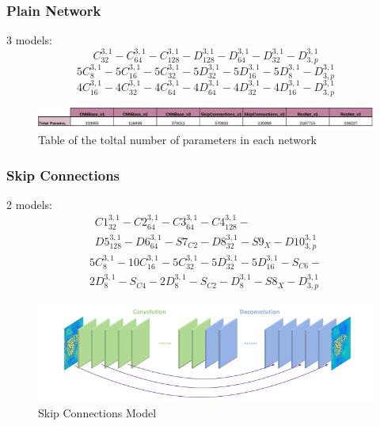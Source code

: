 \documentclass [handout] {beamer}
\begin{document}
\begin{frame}
	\frametitle{Plain Network}
	3 models:
	\begin{equation}
		C_{32}^{3,1} - C_{64}^{3,1} - C_{128}^{3,1} - D_{128}^{3,1} - D_{64}^{3,1} - D_{32}^{3,1} - D_{3,p}^{3,1} 
		\label{CNNbase_v1}
	\end{equation}
	\medskip
	\begin{equation}
		5C_{8}^{3,1} - 5C_{16}^{3,1} - 5C_{32}^{3,1} - 5D_{32}^{3,1} - 5D_{16}^{3,1} - 5D_{8}^{3,1} - D_{3,p}^{3,1} 
		\label{CNNbase_v2}
	\end{equation}
	\medskip
	\begin{equation}
		4C_{16}^{3,1} - 4C_{32}^{3,1} - 4C_{64}^{3,1} - 4D_{64}^{3,1} - 4D_{32}^{3,1} - 4D_{16}^{3,1} - D_{3,p}^{3,1} 
		\label{CNNbase_v2}
	\end{equation}
	\begin{figure}[hbtp]
		\centering
		\includegraphics[scale=0.35]{params_table.png}
		\caption{Table of the toltal number of parameters in each network}\label{table_params}
	\end{figure}
\end{frame}

\begin{frame}
	\frametitle{Skip Connections}
	2 models:
	\begin{equation}
	\begin{split}
		C1_{32}^{3,1} - C2_{64}^{3,1} - C3_{64}^{3,1} - C4_{128}^{3,1} - \\ D5_{128}^{3,1} - D6_{64}^{3,1} - S7_{C2} - D8_{32}^{3,1} - S9_X - D10_{3,p}^{3,1} 
	\end{split}
	\end{equation}
	\medskip
	\begin{equation}
	\begin{split}
		5C_{8}^{3,1} - 10C_{16}^{3,1} - 5C_{32}^{3,1} - 5D_{32}^{3,1} - 5D_{16}^{3,1} - S_{C6} - \\ 2D_{8}^{3,1} - S_{C4} - 2D_{8}^{3,1} - S_{C2} -D_{8}^{3,1} - S8_X - D_{3,p}^{3,1} 
	\end{split}
	\end{equation}
	\begin{figure}[hbtp]
		\centering
		\includegraphics[scale=0.35]{skipconnections_model.png}
		\caption{Skip Connections Model}\label{skips_model}
	\end{figure}
\end{frame}
\end{document}
